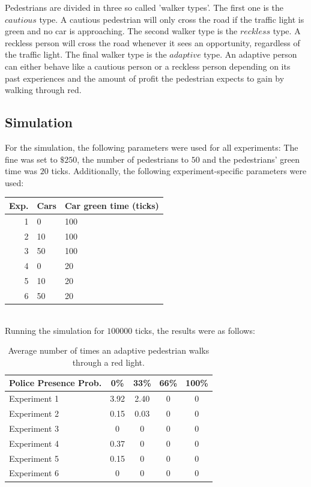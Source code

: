 \documentclass[a4paper]{article}
\begin{document}
Pedestrians are divided in three so called 'walker types'. The first one is the $cautious$ type. A cautious pedestrian will only cross the road if the traffic light is green and no car is approaching. The second walker type is the $reckless$ type. A reckless person will cross the road whenever it sees an opportunity, regardless of the traffic light. The final walker type is the $adaptive$ type. An adaptive person can either behave like a cautious person or a reckless person depending on its past experiences and the amount of profit the pedestrian expects to gain by walking through red.

\subsection{Simulation}
\label{sec:initialsim}
For the simulation, the following parameters were used for all experiments: The fine was set to $\$250$, the number of pedestrians to $50$ and the pedestrians' green time was $20$ ticks. Additionally, the following experiment-specific parameters were used:\\

\begin{tabular}{ r | l | l }
  Exp. & Cars & Car green time (ticks) \\
  \hline
  1 &  0 & 100 \\
  2 & 10 & 100 \\
  3 & 50 & 100 \\
  4 &  0 & 20  \\
  5 & 10 & 20  \\
  6 & 50 & 20  \\
\end{tabular}\\

Running the simulation for $100 000$ ticks, the results were as follows:
\begin{table}[H]
\centering
\begin{tabular}{ l | c c c c }
  Police Presence Prob. & 0\% & 33\% & 66\% & 100\% \\ 
  \hline
  Experiment 1 & 3.92 & 2.40 & 0 & 0  \\
  Experiment 2 & 0.15 & 0.03 & 0 & 0  \\
  Experiment 3 & 0    & 0    & 0 & 0  \\
  Experiment 4 & 0.37 & 0    & 0 & 0  \\
  Experiment 5 & 0.15 & 0    & 0 & 0  \\
  Experiment 6 & 0    & 0    & 0 & 0  \\
\end{tabular}
\caption{Average number of times an adaptive 
pedestrian walks through a red light.}
\end{table}
\end{document}
